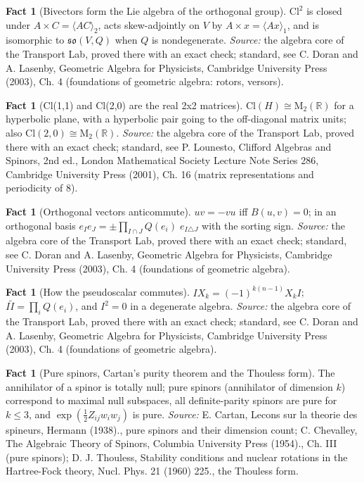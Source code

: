 \documentclass[11pt]{article}
\theoremstyle{definition}
\newtheorem{fact}[theorem]{Fact}
\theoremstyle{plain}
\providecommand{\Cl}{}\renewcommand{\Cl}{\mathrm{Cl}}
\providecommand{\Mat}{}\renewcommand{\Mat}{\mathrm{M}}
\providecommand{\R}{}\renewcommand{\R}{\mathbb{R}}
\providecommand{\so}{}\renewcommand{\so}{\mathfrak{so}}
\begin{document}
\begin{fact}[Bivectors form the Lie algebra of the orthogonal group]\label{c:std-algebra.bivector-lie-algebra}
$\Cl^{2}$ is closed under $A \times C = \langle AC \rangle_2$, acts skew-adjointly on $V$ by $A \times x = \langle Ax \rangle_1$, and is isomorphic to $\so(V,Q)$ when $Q$ is nondegenerate.
\emph{Source:} the algebra core of the Transport Lab, proved there with an exact check; standard, see C. Doran and A. Lasenby, Geometric Algebra for Physicists, Cambridge University Press (2003), Ch. 4 (foundations of geometric algebra: rotors, versors).
\end{fact}

\begin{fact}[Cl(1,1) and Cl(2,0) are the real 2x2 matrices]\label{c:std-algebra.cl11-matrix}
$\Cl(H) \cong \Mat_2(\R)$ for a hyperbolic plane, with a hyperbolic pair going to the off-diagonal matrix units; also $\Cl(2,0) \cong \Mat_2(\R)$.
\emph{Source:} the algebra core of the Transport Lab, proved there with an exact check; standard, see P. Lounesto, Clifford Algebras and Spinors, 2nd ed., London Mathematical Society Lecture Note Series 286, Cambridge University Press (2001), Ch. 16 (matrix representations and periodicity of 8).
\end{fact}

\begin{fact}[Orthogonal vectors anticommute]\label{c:std-algebra.orthogonal-anticommute}
$uv = -vu$ iff $B(u,v) = 0$; in an orthogonal basis $e_I e_J = \pm \prod_{I \cap J} Q(e_i)\; e_{I \triangle J}$ with the sorting sign.
\emph{Source:} the algebra core of the Transport Lab, proved there with an exact check; standard, see C. Doran and A. Lasenby, Geometric Algebra for Physicists, Cambridge University Press (2003), Ch. 4 (foundations of geometric algebra).
\end{fact}

\begin{fact}[How the pseudoscalar commutes]\label{c:std-algebra.pseudoscalar-commutation}
$I X_k = (-1)^{k(n-1)} X_k I$; $I\tilde{I} = \prod_i Q(e_i)$, and $I^{2} = 0$ in a degenerate algebra.
\emph{Source:} the algebra core of the Transport Lab, proved there with an exact check; standard, see C. Doran and A. Lasenby, Geometric Algebra for Physicists, Cambridge University Press (2003), Ch. 4 (foundations of geometric algebra).
\end{fact}

\begin{fact}[Pure spinors, Cartan's purity theorem and the Thouless form]\label{c:std-algebra.pure-spinors}
The annihilator of a spinor is totally null; pure spinors (annihilator of dimension $k$) correspond to maximal null subspaces, all definite-parity spinors are pure for $k \le 3$, and $\exp(\tfrac12 Z_{ij} w_i w_j)$ is pure.
\emph{Source:} E. Cartan, Lecons sur la theorie des spineurs, Hermann (1938)., pure spinors and their dimension count; C. Chevalley, The Algebraic Theory of Spinors, Columbia University Press (1954)., Ch. III (pure spinors); D. J. Thouless, Stability conditions and nuclear rotations in the Hartree-Fock theory, Nucl. Phys. 21 (1960) 225., the Thouless form.
\end{fact}
\end{document}
